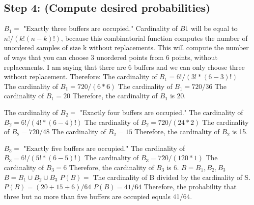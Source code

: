 \documentclass[a4paper,10pt]{article}
\begin{document}
\subsection{Step 4: (Compute desired probabilities)}
$ B_{1} = $ "Exactly three buffers are occupied."
Cardinality of $ B{1} $ will be equal to $ n!/(k!(n-k)!) $, because this combinatorial function computes the number 
of unordered samples of size k without replacements. This will compute the number of ways that you can choose 3 
unordered points from 6 points, without replacements. I am saying that there are 6 buffers and we can only 
choose three without replacement. Therefore: \newline
The cardinality of $ B_{1} = 6!/(3!*(6-3)!) $ \newline
The cardinality of $ B_{1} = 720/(6*6) $ \newline
The cardinality of $ B_{1} = 720/36 $ \newline
The cardinality of $ B_{1} = 20 $ \newline
Therefore, the cardinality of $ B_{1} $ is 20. \newline

The cardinality of $ B_{2} = $ "Exactly four buffers are occupied."
The cardinality of $ B_{2} = 6!/(4!*(6-4)!) $ \newline
The cardinality of $ B_{2} = 720/(24*2) $ \newline
The cardinality of $ B_{2} = 720/48 $ \newline
The cardinality of $ B_{2} = 15 $ \newline
Therefore, the cardinality of $ B_{2} $ is 15. \newline

$ B_{3} = $ "Exactly five buffers are occupied."
The cardinality of $ B_{3} = 6!/(5!*(6-5)!) $ \newline
The cardinality of $ B_{3} = 720/(120*1) $
The cardinality of $ B_{3} = 6 $ \newline
Therefore, the cardinality of $ B_{3} $ is 6. \newline
$ B = {B_{1}, B_{2}, B_{3}} $ \newline
$ B = B_{1} \cup B_{2} \cup B_{3} $ \newline
$ P(B) = $ The cardinality of B divided by the cardinality of S. \newline
$ P(B) = (20+15+6)/64 $ \newline
$ P(B) = 41 /64 $ \newline
Therefore, the probability that three but no more than five buffers are occupied equals 41/64.
\end{document}
